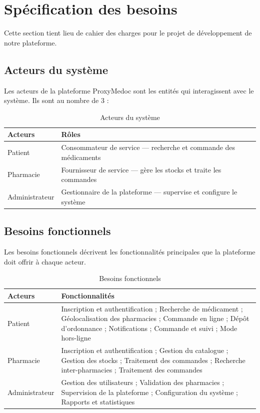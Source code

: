 \documentclass[12pt,a4paper]{report}
\begin{document}
	\chapter{Spécification des besoins} %
	Cette section tient lieu de cahier des charges pour le projet de développement de notre plateforme.
	\section{Acteurs du système} %
	Les acteurs de la plateforme ProxyMedoc sont les entités qui interagissent avec le système. 
	Ils sont au nombre de 3 :\\ 
	
	\begin{table}[H] 
		\centering 
		\begin{tabular}{lp{10cm}} 
			\toprule 
			\textbf{Acteurs} & \textbf{Rôles} \\ 
			\toprule 
			Patient    & Consommateur de service — recherche et commande des médicaments \\ 
			Pharmacie   & Fournisseur de service — gère les stocks et traite les commandes \\ 
			Administrateur & Gestionnaire de la plateforme — supervise et configure le système \\ 
			\bottomrule 
		\end{tabular} 
        \caption{Acteurs du système}
	\end{table} 
	
	\section{Besoins fonctionnels} 
	Les besoins fonctionnels décrivent les fonctionnalités principales que la plateforme doit offrir à chaque acteur.\\ 
	
	\begin{table}[H] 
		\centering 
		\begin{tabular}{lp{10cm}} 
			\toprule 
			\textbf{Acteurs} & \textbf{Fonctionnalités} \\ 
			\toprule 
			Patient        & Inscription et authentification ; Recherche de médicament ; %
			Géolocalisation des pharmacies ; Commande en ligne ; Dépôt d'ordonnance ; Notifications ; Commande et suivi ; Mode hors-ligne \\[4pt] %
			Pharmacie      & Inscription et authentification ; Gestion du catalogue ; %
			Gestion des stocks ; Traitement des commandes ; Recherche inter-pharmacies ; Traitement des commandes \\[4pt] %
			Administrateur & Gestion des utilisateurs ; Validation des pharmacies ; Supervision de la plateforme ; Configuration du système ; Rapports et statistiques \\ %
			\bottomrule 
		\end{tabular} 
        \caption{Besoins fonctionnels}
	\end{table} 
	
\end{document}
